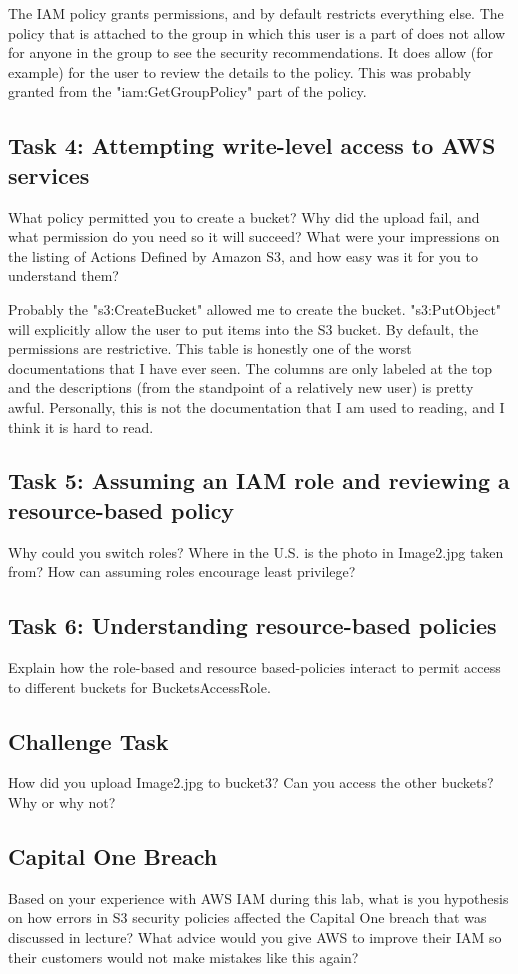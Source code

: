 \documentclass[11pt]{article}
\begin{document}
The IAM policy grants permissions, and by default restricts everything else. The policy that is attached to the group in which this user is a part of does not allow for anyone in the group to see the security recommendations. It does allow (for example) for the user to review the details to the policy. This was probably granted from the "iam:GetGroupPolicy" part of the policy.


\subsection*{Task 4: Attempting write-level access to AWS services}
What policy permitted you to create a bucket? Why did the upload fail, and what permission do you need so it will succeed? What were your impressions on the listing of Actions Defined by Amazon S3, and how easy was it for you to understand them?

Probably the "s3:CreateBucket" allowed me to create the bucket. "s3:PutObject" will explicitly allow the user to put items into the S3 bucket. By default, the permissions are restrictive. This table is honestly one of the worst documentations that I have ever seen. The columns are only labeled at the top and the descriptions (from the standpoint of a relatively new user) is pretty awful. Personally, this is not the documentation that I am used to reading, and I think it is hard to read.


\subsection*{Task 5: Assuming an IAM role and reviewing a resource-based policy}
Why could you switch roles? Where in the U.S. is the photo in Image2.jpg taken from? How can assuming roles encourage least privilege?


\subsection*{Task 6: Understanding resource-based policies}
Explain how the role-based and resource based-policies interact to permit access to different buckets for BucketsAccessRole.


\subsection*{Challenge Task}
How did you upload Image2.jpg to bucket3? Can you access the other buckets? Why or why not?


\subsection*{Capital One Breach}
Based on your experience with AWS IAM during this lab, what is you hypothesis on how errors in S3 security policies affected the Capital One breach that was discussed in lecture? What advice would you give AWS to improve their IAM so their customers would not make mistakes like this again?
\end{document}
